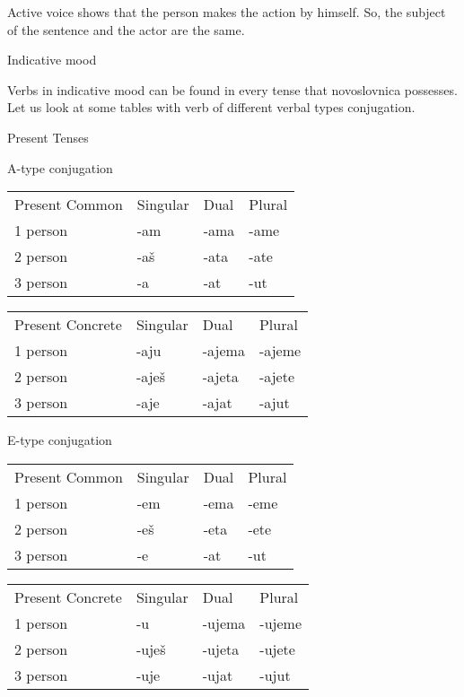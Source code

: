 Active voice shows that the person makes the action by himself. So, the subject of the sentence and the actor are the same.

Indicative mood

Verbs in indicative mood can be found in every tense that novoslovnica possesses. Let us look at some tables with verb of different verbal types conjugation.

Present Tenses

A-type conjugation

\begin{table}
	\begin{tabular}{llll}
		Present Common & Singular & Dual & Plural \\
		1 person & -am & -ama & -ame \\
		2 person & -aš & -ata & -ate \\
		3 person & -a & -at & -ut
	\end{tabular}
\end{table}


\begin{table}
	\begin{tabular}{llll}
		Present Concrete & Singular & Dual & Plural \\
		1 person & -aju & -ajema & -ajeme \\
		2 person & -aješ & -ajeta & -ajete \\
		3 person & -aje & -ajat & -ajut
	\end{tabular}
\end{table}

E-type conjugation

\begin{table}
	\begin{tabular}{llll}
		Present Common & Singular & Dual & Plural \\
		1 person & -em & -ema & -eme \\
		2 person & -eš & -eta & -ete \\
		3 person & -e & -at & -ut
	\end{tabular}
\end{table}


\begin{table}
	\begin{tabular}{llll}
		Present Concrete & Singular & Dual & Plural \\
		1 person & -u & -ujema & -ujeme \\
		2 person & -uješ & -ujeta & -ujete \\
		3 person & -uje & -ujat & -ujut
	\end{tabular}
\end{table}

